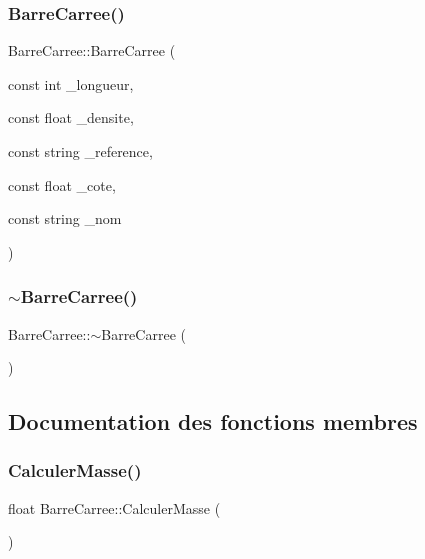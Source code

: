 \subsubsection{\texorpdfstring{Barre\+Carree()}{BarreCarree()}}
{\footnotesize\ttfamily Barre\+Carree\+::\+Barre\+Carree (\begin{DoxyParamCaption}\item[{const int}]{\+\_\+longueur,  }\item[{const float}]{\+\_\+densite,  }\item[{const string}]{\+\_\+reference,  }\item[{const float}]{\+\_\+cote,  }\item[{const string}]{\+\_\+nom }\end{DoxyParamCaption})}

\mbox{\label{class_barre_carree_adc7972248e876187bc99b921079eb280}} 
\subsubsection{\texorpdfstring{$\sim$\+Barre\+Carree()}{~BarreCarree()}}
{\footnotesize\ttfamily Barre\+Carree\+::$\sim$\+Barre\+Carree (\begin{DoxyParamCaption}{ }\end{DoxyParamCaption})}



\subsection{Documentation des fonctions membres}
\mbox{\label{class_barre_carree_a8dc111b64759b1df3630fc158ff4efb5}} 
\subsubsection{\texorpdfstring{Calculer\+Masse()}{CalculerMasse()}}
{\footnotesize\ttfamily float Barre\+Carree\+::\+Calculer\+Masse (\begin{DoxyParamCaption}{ }\end{DoxyParamCaption})}

